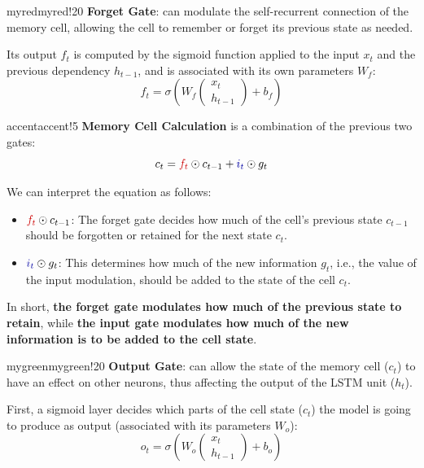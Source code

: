 \begin{remark}{myred}{myred!20}
\textbf{Forget Gate}: can modulate the self-recurrent connection of the memory cell, allowing the cell to remember or forget its previous state as needed.

Its output $f_t$ is computed by the sigmoid function applied to the input $x_t$ and the previous dependency $h_{t-1}$, and is associated with its own parameters $W_f$:
$$ f_t = \sigma(W_f
\begin{pmatrix}
x_t \\
h_{t-1}
\end{pmatrix} + b_f)
$$
\end{remark}


\begin{remark}{accent}{accent!5}
\textbf{Memory Cell Calculation} is a combination of the previous two gates:
$$c_t = \textcolor{myred}{f_t} \odot c_{t-1} + \textcolor{mybluee}{i_t} \odot g_t $$

We can interpret the equation as follows:
\begin{itemize}
    \item \( \textcolor{myred}{f_t} \odot c_{t-1}\): The forget gate decides how much of the cell's previous state \( c_{t-1} \) should be forgotten or retained for the next state \( c_t \).
    
    \item \( \textcolor{mybluee}{i_t} \odot g_t \): This determines how much of the new information \( g_t \), i.e., the value of the input modulation, should be added to the state of the cell \( c_t \).
\end{itemize}
In short, \textbf{\textcolor{myred}{the forget gate modulates how much of the previous state to retain}}, while \textbf{\textcolor{myblue}{the input gate modulates how much of the new information is to be added to the cell state}}.
\end{remark}

\begin{remark}{mygreen}{mygreen!20}
\textbf{Output Gate}: can allow the state of the memory cell ($c_t$) to have an effect on other neurons, thus affecting the output of the LSTM unit ($h_t$).

First, a sigmoid layer decides which parts of the cell state ($c_t$) the model is going to produce as output (associated with its parameters $W_o$):
$$ o_t = \sigma(W_o
\begin{pmatrix}
x_t \\
h_{t-1}
\end{pmatrix} + b_o)
$$
\end{remark}

